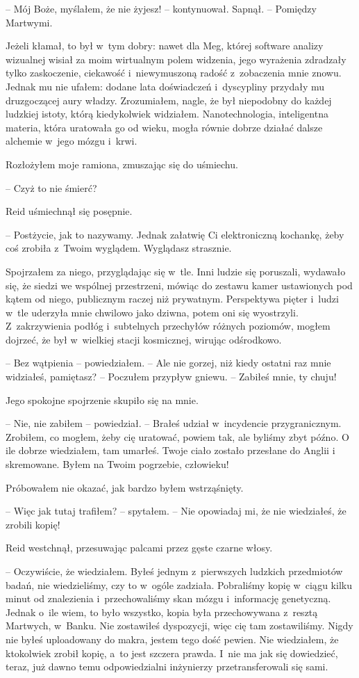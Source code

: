\documentclass[oneside,polish,11pt,sfheadings]{mwbk}
\begin{document}
-- Mój Boże, myślałem, że nie żyjesz! -- kontynuował. Sapnął. -- Pomiędzy
Martwymi.

Jeżeli kłamał, to był w~tym dobry: nawet dla Meg, której software
analizy wizualnej wisiał za moim wirtualnym polem widzenia, jego
wyrażenia zdradzały tylko zaskoczenie, ciekawość i~niewymuszoną radość z~zobaczenia mnie znowu. Jednak mu nie ufałem: dodane lata doświadczeń i~dyscypliny przydały mu druzgoczącej aury władzy. Zrozumiałem, nagle, że
był niepodobny do każdej ludzkiej istoty, którą kiedykolwiek widziałem.
Nanotechnologia, inteligentna materia, która uratowała go od wieku,
mogła równie dobrze działać dalsze alchemie w~jego mózgu i~krwi.

Rozłożyłem moje ramiona, zmuszając się do uśmiechu. 

-- Czyż to nie
śmierć?

Reid uśmiechnął się posępnie. 

-- Postżycie, jak to nazywamy. Jednak
załatwię Ci elektroniczną kochankę, żeby coś zrobiła z~Twoim wyglądem.
Wyglądasz strasznie.

Spojrzałem za niego, przyglądając się w~tle. Inni ludzie się poruszali,
wydawało się, że siedzi we wspólnej przestrzeni, mówiąc do zestawu kamer
ustawionych pod kątem od niego, publicznym raczej niż prywatnym.
Perspektywa pięter i~ludzi w~tle uderzyła mnie chwilowo jako dziwna,
potem oni się wyostrzyli. Z~zakrzywienia podłóg i~subtelnych przechyłów
różnych poziomów, mogłem dojrzeć, że był w~wielkiej stacji kosmicznej,
wirując odśrodkowo.

-- Bez wątpienia -- powiedziałem. -- Ale nie gorzej, niż kiedy ostatni raz
mnie widziałeś, pamiętasz? -- Poczułem przypływ gniewu. -- Zabiłeś mnie,
ty chuju!

Jego spokojne spojrzenie skupiło się na mnie. 

-- Nie, nie zabiłem -- powiedział. -- Brałeś udział w~incydencie przygranicznym. Zrobiłem, co mogłem, żeby cię uratować, powiem tak, ale byliśmy zbyt późno. O ile
dobrze wiedziałem, tam umarłeś. Twoje ciało zostało przesłane do Anglii
i skremowane. Byłem na Twoim pogrzebie, człowieku!

Próbowałem nie okazać, jak bardzo byłem wstrząśnięty. 

-- Więc jak tutaj
trafiłem? -- spytałem. -- Nie opowiadaj mi, że nie wiedziałeś, że zrobili
kopię!

Reid westchnął, przesuwając palcami przez gęste czarne włosy. 

-- Oczywiście, że wiedziałem. Byłeś jednym z~pierwszych ludzkich
przedmiotów badań, nie wiedzieliśmy, czy to w~ogóle zadziała. Pobraliśmy
kopię w~ciągu kilku minut od znalezienia i~przechowaliśmy skan mózgu i~informację genetyczną. Jednak o~ile wiem, to było wszystko, kopia była
przechowywana z~resztą Martwych, w~Banku. Nie zostawiłeś dyspozycji,
więc cię tam zostawiliśmy. Nigdy nie byłeś uploadowany do makra, jestem
tego dość pewien. Nie wiedziałem, że ktokolwiek zrobił kopię, a~to jest
szczera prawda. I~nie ma jak się dowiedzieć, teraz, już dawno temu
odpowiedzialni inżynierzy przetransferowali się sami.
\end{document}
